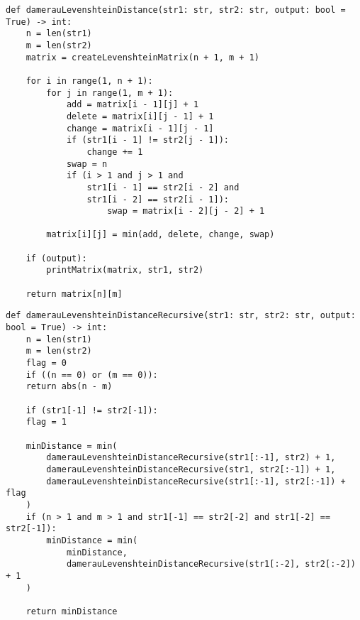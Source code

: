 \begin{center}
    \captionsetup{justification=raggedright,singlelinecheck=off}
    \begin{lstlisting}[label=lst:dam_lev_mat,caption=Алгоритм нахождения расстояния Дамерау-Левенштейна (матричный)]
def damerauLevenshteinDistance(str1: str, str2: str, output: bool = True) -> int:
	n = len(str1)
	m = len(str2)
	matrix = createLevenshteinMatrix(n + 1, m + 1)
	
	for i in range(1, n + 1):
		for j in range(1, m + 1):
			add = matrix[i - 1][j] + 1
			delete = matrix[i][j - 1] + 1
			change = matrix[i - 1][j - 1]
			if (str1[i - 1] != str2[j - 1]):
				change += 1
			swap = n
			if (i > 1 and j > 1 and
				str1[i - 1] == str2[i - 2] and
				str1[i - 2] == str2[i - 1]):
					swap = matrix[i - 2][j - 2] + 1
		
		matrix[i][j] = min(add, delete, change, swap)
	
	if (output):
		printMatrix(matrix, str1, str2)
	
	return matrix[n][m]
\end{lstlisting}
\end{center}


\begin{center}
    \captionsetup{justification=raggedright,singlelinecheck=off}
    \begin{lstlisting}[label=lst:dam_lev_rec,caption=Алгоритм нахождения расстояния Дамерау-Левенштейна (рекурсивный)]
def damerauLevenshteinDistanceRecursive(str1: str, str2: str, output: bool = True) -> int:
	n = len(str1)
	m = len(str2)
	flag = 0
	if ((n == 0) or (m == 0)):
	return abs(n - m)
	
	if (str1[-1] != str2[-1]):
	flag = 1
	
	minDistance = min(
		damerauLevenshteinDistanceRecursive(str1[:-1], str2) + 1,
		damerauLevenshteinDistanceRecursive(str1, str2[:-1]) + 1,
		damerauLevenshteinDistanceRecursive(str1[:-1], str2[:-1]) + flag
	)
	if (n > 1 and m > 1 and str1[-1] == str2[-2] and str1[-2] == str2[-1]):
		minDistance = min(
			minDistance,
			damerauLevenshteinDistanceRecursive(str1[:-2], str2[:-2]) + 1
	)
	
	return minDistance
\end{lstlisting}
\end{center}


